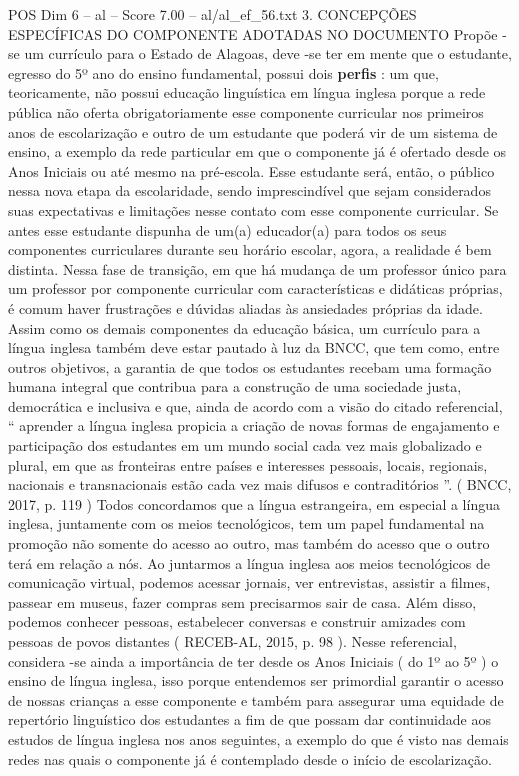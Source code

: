 \begin{textsample}{POS Dim 6 – al – Score 7.00 – al/al\_ef\_56.txt}  \label{ex:f6_pos_226}
3.
CONCEPÇÕES ESPECÍFICAS DO COMPONENTE ADOTADAS NO DOCUMENTO Propõe -se um currículo para o Estado de Alagoas, deve -se ter em mente que o estudante, egresso do 5º ano do ensino fundamental, possui dois \textbf{perfis} : um que, teoricamente, não possui educação linguística em língua inglesa porque a rede pública não oferta obrigatoriamente esse componente curricular nos primeiros anos de escolarização e outro de um estudante que poderá vir de um sistema de ensino, a exemplo da rede particular em que o componente já é ofertado desde os Anos Iniciais ou até mesmo na pré-escola.
Esse estudante será, então, o público nessa nova etapa da escolaridade, sendo imprescindível que sejam considerados suas expectativas e limitações nesse contato com esse componente curricular.
Se antes esse estudante dispunha de um(a) educador(a) para todos os seus componentes curriculares durante seu horário escolar, agora, a realidade é bem distinta.
Nessa fase de transição, em que há mudança de um professor único para um professor por componente curricular com características e didáticas próprias, é comum haver frustrações e dúvidas aliadas às ansiedades próprias da idade.
Assim como os demais componentes da educação básica, um currículo para a língua inglesa também deve estar pautado à luz da BNCC, que tem como, entre outros objetivos, a garantia de que todos os estudantes recebam uma formação humana integral que contribua para a construção de uma sociedade justa, democrática e inclusiva e que, ainda de acordo com a visão do citado referencial, “ aprender a língua inglesa propicia a criação de novas formas de engajamento e participação dos estudantes em um mundo social cada vez mais globalizado e plural, em que as fronteiras entre países e interesses pessoais, locais, regionais, nacionais e transnacionais estão cada vez mais difusos e contraditórios ”. ( BNCC, 2017, p. 119 ) Todos concordamos que a língua estrangeira, em especial a língua inglesa, juntamente com os meios tecnológicos, tem um papel fundamental na promoção não somente do acesso ao outro, mas também do acesso que o outro terá em relação a nós.
Ao juntarmos a língua inglesa aos meios tecnológicos de comunicação virtual, podemos acessar jornais, ver entrevistas, assistir a filmes, passear em museus, fazer compras sem precisarmos sair de casa.
Além disso, podemos conhecer pessoas, estabelecer conversas e construir amizades com pessoas de povos distantes ( RECEB-AL, 2015, p. 98 ).
Nesse referencial, considera -se ainda a importância de ter desde os Anos Iniciais ( do 1º ao 5º ) o ensino de língua inglesa, isso porque entendemos ser primordial garantir o acesso de nossas crianças a esse componente e também para assegurar uma equidade de repertório linguístico dos estudantes a fim de que possam dar continuidade aos estudos de língua inglesa nos anos seguintes, a exemplo do que é visto nas demais redes nas quais o componente já é contemplado desde o início de escolarização.

\end{textsample}
